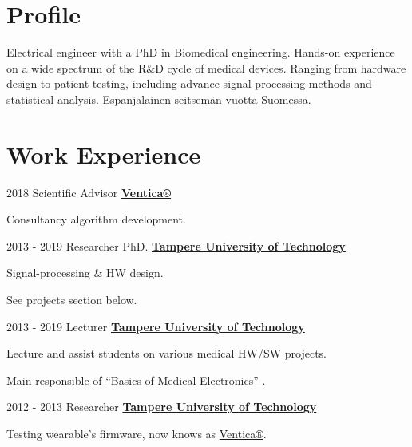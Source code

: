 \documentclass[letterpaper]{twentysecondcv} %
\begin{document}
\begin{RigthPage1}
\section{Profile}  
Electrical engineer with a PhD in Biomedical engineering. Hands-on experience on a wide spectrum of the R\&D cycle of medical devices. Ranging from hardware design to patient testing, including advance signal processing methods and statistical analysis. Espanjalainen seitsemän vuotta Suomessa.  
\\
\section{Work Experience}        
\begin{twenty}
	\twentyitemlist
    	{2018}
        {Scientific Advisor}
        {\href{https://www.ventica.net/}{\textbf{Ventica®}}} 
        {
          \item Consultancy algorithm development.
        }
        
	\twentyitemlist
    	{2013 - 2019}
        {Researcher PhD.}
        {\href{https://www.tut.fi/}{\textbf{Tampere University of Technology}}}
        {
          \item Signal-processing \& HW design.
          \item See projects section below.
        }
        
	\twentyitemlist
    	{2013 - 2019}
        {Lecturer}
        {\href{https://www.tut.fi/}{\textbf{Tampere University of Technology}}}
        {
        \item Lecture and assist students on various medical HW/SW projects.  
        \item Main responsible of 
\href{https://www.youtube.com/watch?time_continue=1&v=E3D8rAG6S4Q}{“Basics of Medical Electronics” }.
        }

	\twentyitemlist
    	{2012 - 2013}
        {Researcher}
        {\href{https://www.tut.fi/}{\textbf{Tampere University of Technology}}}
        {
        \item Testing wearable's firmware, now knows as \href{https://www.ventica.net/}{Ventica®}.   }


\end{twenty}
\end{RigthPage1}
\end{document}
